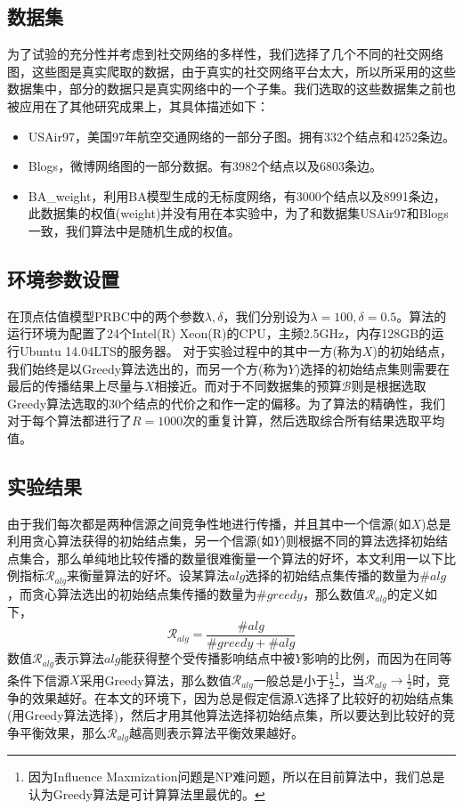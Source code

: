 \subsection{数据集}
\label{sec:chap4-exp-datasets}
为了试验的充分性并考虑到社交网络的多样性，我们选择了几个不同的社交网络图，这些图是真实爬取的数据，由于真实的社交网络平台太大，所以所采用的这些数据集中，部分的数据只是真实网络中的一个子集。我们选取的这些数据集之前也被应用在了其他研究成果上，其具体描述如下：
\begin{itemize}
\item USAir97\cite{batagelj2009pajek}，美国97年航空交通网络的一部分子图。拥有332个结点和4252条边。
\item Blogs\cite{xie2006social}，微博网络图的一部分数据。有3982个结点以及6803条边。
\item BA\_weight，利用BA模型生成的无标度网络，有3000个结点以及8991条边，此数据集的权值(weight)并没有用在本实验中，为了和数据集USAir97和Blogs一致，我们算法中是随机生成的权值。
\end{itemize}

\subsection{环境参数设置}
\label{sec:chap4-exp-setup}
在顶点估值模型PRBC中的两个参数$\lambda,\delta$，我们分别设为$\lambda=100,\delta=0.5$。算法的运行环境为配置了24个Intel(R) Xeon(R)的CPU，主频2.5GHz，内存128GB的运行Ubuntu 14.04LTS的服务器。
对于实验过程中的其中一方(称为$X$)的初始结点，我们始终是以Greedy算法选出的，而另一个方(称为$Y$)选择的初始结点集则需要在最后的传播结果上尽量与$X$相接近。而对于不同数据集的预算$\mathcal{B}$则是根据选取Greedy算法选取的30个结点的代价之和作一定的偏移。为了算法的精确性，我们对于每个算法都进行了$R=1000$次的重复计算，然后选取综合所有结果选取平均值。

\subsection{实验结果}
\label{sec:chap4-exp-results}
由于我们每次都是两种信源之间竞争性地进行传播，并且其中一个信源(如$X$)总是利用贪心算法获得的初始结点集，另一个信源(如$Y$)则根据不同的算法选择初始结点集合，那么单纯地比较传播的数量很难衡量一个算法的好坏，本文利用一以下比例指标$\mathcal{R}_{alg}$来衡量算法的好坏。设某算法$alg$选择的初始结点集传播的数量为$\#alg$，而贪心算法选出的初始结点集传播的数量为$\#greedy$，那么数值$\mathcal{R}_{alg}$的定义如下，
\begin{displaymath}
\mathcal{R}_{alg}=\frac{\#alg}{\#greedy+\#alg}
\end{displaymath}
数值$\mathcal{R}_{alg}$表示算法$alg$能获得整个受传播影响结点中被$Y$影响的比例，而因为在同等条件下信源$X$采用Greedy算法，那么数值$\mathcal{R}_{alg}$一般总是小于$\frac{1}{2}$\footnote{因为Influence Maxmization问题是NP难问题，所以在目前算法中，我们总是认为Greedy算法是可计算算法里最优的。}，当$\mathcal{R}_{alg} \rightarrow \frac{1}{2}$时，竞争的效果越好。在本文的环境下，因为总是假定信源$X$选择了比较好的初始结点集(用Greedy算法选择)，然后才用其他算法选择初始结点集，所以要达到比较好的竞争平衡效果，那么$\mathcal{R}_{alg}$越高则表示算法平衡效果越好。

